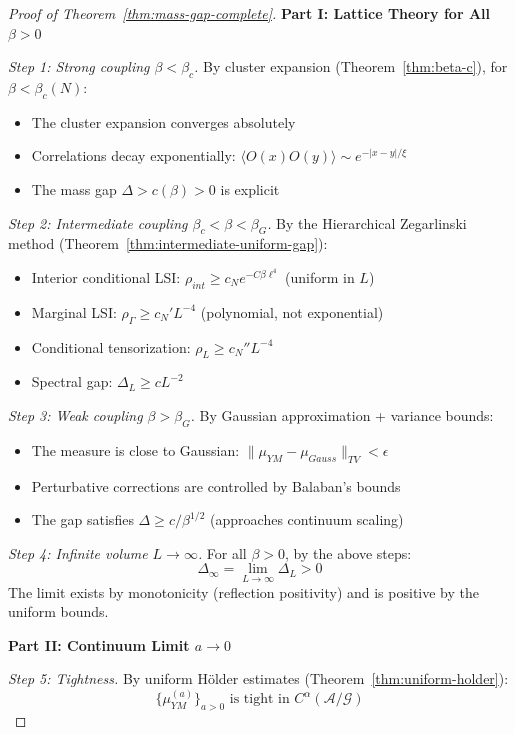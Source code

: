 \begin{proof}[Proof of Theorem~\ref{thm:mass-gap-complete}]

\textbf{Part I: Lattice Theory for All $\beta > 0$}

\textit{Step 1: Strong coupling $\beta < \beta_c$.}
By cluster expansion (Theorem~\ref{thm:beta-c}), for $\beta < \beta_c(N)$:
\begin{itemize}
\item The cluster expansion converges absolutely
\item Correlations decay exponentially: $\langle O(x) O(y) \rangle \sim e^{-|x-y|/\xi}$
\item The mass gap $\Delta > c(\beta) > 0$ is explicit
\end{itemize}

\textit{Step 2: Intermediate coupling $\beta_c < \beta < \beta_G$.}
By the Hierarchical Zegarlinski method (Theorem~\ref{thm:intermediate-uniform-gap}):
\begin{itemize}
\item Interior conditional LSI: $\rho_{int} \geq c_N e^{-C\beta\ell^4}$ (uniform in $L$)
\item Marginal LSI: $\rho_\Gamma \geq c_N' L^{-4}$ (polynomial, not exponential)
\item Conditional tensorization: $\rho_L \geq c_N'' L^{-4}$
\item Spectral gap: $\Delta_L \geq c L^{-2}$
\end{itemize}

\textit{Step 3: Weak coupling $\beta > \beta_G$.}
By Gaussian approximation + variance bounds:
\begin{itemize}
\item The measure is close to Gaussian: $\|\mu_{YM} - \mu_{Gauss}\|_{TV} < \epsilon$
\item Perturbative corrections are controlled by Balaban's bounds
\item The gap satisfies $\Delta \geq c/\beta^{1/2}$ (approaches continuum scaling)
\end{itemize}

\textit{Step 4: Infinite volume $L \to \infty$.}
For all $\beta > 0$, by the above steps:
\[
\Delta_\infty = \lim_{L \to \infty} \Delta_L > 0
\]
The limit exists by monotonicity (reflection positivity) and is positive by 
the uniform bounds.

\textbf{Part II: Continuum Limit $a \to 0$}

\textit{Step 5: Tightness.}
By uniform Hölder estimates (Theorem~\ref{thm:uniform-holder}):
\[
\{\mu_{YM}^{(a)}\}_{a > 0} \text{ is tight in } C^\alpha(\mathcal{A}/\mathcal{G})
\]


\end{proof}
